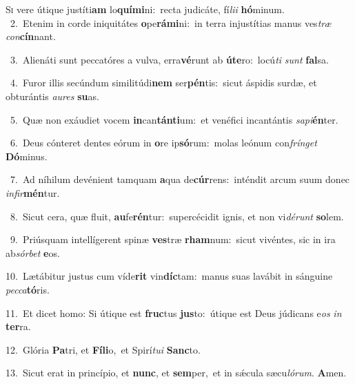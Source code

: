 \lettrine{\initial\textcolor{\initialcolor}{S}}{i} vere útique justíti\textbf{am} lo\-\textbf{quí}\-\textbf{mi}ni:~\star recta judicáte, fí\-\textit{li}\-\textit{i} \textbf{hó}\-minum.\\
{\numbfont\textcolor{\numbcolor}{~2.}}~Etenim in corde iniquitátes \textbf{o}\-pe\-\textbf{rá}\-\textbf{mi}ni:~\star in terra injustítias manus ves\textit{træ} \textit{con}\-\textbf{cín}nant.\par
{\numbfont\textcolor{\numbcolor}{~3.}}~Alienáti sunt peccatóres a vulva, erra\-\textbf{vé}\-runt ab \textbf{ú}\-\textbf{te}ro:~\star locú\textit{ti} \textit{sunt} \textbf{fal}\-sa.\par
{\numbfont\textcolor{\numbcolor}{~4.}}~Furor illis secúndum similitúdi\textbf{nem} ser\-\textbf{pén}\-tis:~\star sicut áspidis surdæ, et obturántis \textit{au}\-\textit{res} \textbf{su}\-as.\par
{\numbfont\textcolor{\numbcolor}{~5.}}~Quæ non exáudiet vocem \textbf{in}\-can\-\textbf{tán}\-\textbf{ti}um:~\star et venéfici incantántis \textit{sa}\-\textit{pi}\textbf{én}ter.\par
{\numbfont\textcolor{\numbcolor}{~6.}}~Deus cónteret dentes eórum in \textbf{o}\-re ip\-\textbf{só}\-rum:~\star molas leónum con\-\textit{frín}\-\textit{get} \textbf{Dó}\-minus.\par
{\numbfont\textcolor{\numbcolor}{~7.}}~Ad níhilum devénient tamquam \textbf{a}\-qua de\-\textbf{cúr}\-rens:~\star inténdit arcum suum donec \textit{in}\-\textit{fir}\textbf{mén}tur.\par
{\numbfont\textcolor{\numbcolor}{~8.}}~Sicut cera, quæ fluit, \textbf{au}\-fe\-\textbf{rén}\-tur:~\star supercécidit ignis, et non vi\-\textit{dé}\-\textit{runt} \textbf{so}\-lem.\par
{\numbfont\textcolor{\numbcolor}{~9.}}~Priúsquam intellígerent spinæ \textbf{ves}\-træ \textbf{rham}\-num:~\star sicut vivéntes, sic in ira ab\-\textit{sór}\-\textit{bet} \textbf{e}\-os.\par
{\numbfont\textcolor{\numbcolor}{10.}}~Lætábitur justus cum víde\textbf{rit} vin\-\textbf{díc}\-tam:~\star manus suas lavábit in sánguine \textit{pec}\-\textit{ca}\textbf{tó}ris.\par
{\numbfont\textcolor{\numbcolor}{11.}}~Et dicet homo: Si útique est \textbf{fruc}\-tus \textbf{jus}\-to:~\star útique est Deus júdicans e\textit{os} \textit{in} \textbf{ter}\-ra.\par
{\numbfont\textcolor{\numbcolor}{12.}}~Glória \textbf{Pa}\-tri, et \textbf{Fí}\-\textbf{li}o,~\star et Spirí\-\textit{tu}\-\textit{i} \textbf{Sanc}\-to.\par
{\numbfont\textcolor{\numbcolor}{13.}}~Sicut erat in princípio, et \textbf{nunc}\-, et \textbf{sem}\-per,~\star et in sǽcula sæcu\-\textit{ló}\-\textit{rum}. \textbf{A}\-men.\par
